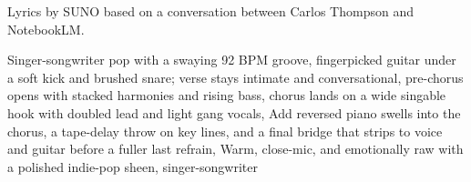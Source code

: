 
\begin{notes}
Lyrics by SUNO based on a conversation between Carlos Thompson and NotebookLM.
\end{notes}
\begin{style}
Singer-songwriter pop with a swaying 92 BPM groove, fingerpicked guitar under a soft kick and brushed snare; verse stays intimate and conversational, pre-chorus opens with stacked harmonies and rising bass, chorus lands on a wide singable hook with doubled lead and light gang vocals, Add reversed piano swells into the chorus, a tape-delay throw on key lines, and a final bridge that strips to voice and guitar before a fuller last refrain, Warm, close-mic, and emotionally raw with a polished indie-pop sheen, singer-songwriter
\end{style}
